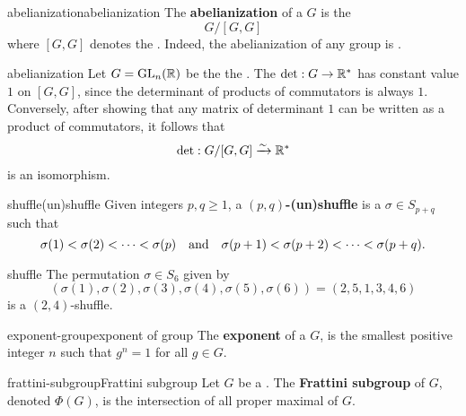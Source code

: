 \begin{topic}{abelianization}{abelianization}
    The \textbf{abelianization} of a  $G$ is the 
    \[ G/[G, G] \]
    where $[G, G]$ denotes the . Indeed, the abelianization of any group is .
\end{topic}

\begin{example}{abelianization}
    Let $G = \textup{GL}_n(\mathbb{R})$ be the the . The  $\det : G \to \mathbb{R}^*$ has constant value $1$ on $[G, G]$, since the determinant of products of commutators is always $1$. Conversely, after showing that any matrix of determinant $1$ can be written as a product of commutators, it follows that
    \[ \det : G / [G, G] \xrightarrow{\sim} \mathbb{R}^* \]
    is an isomorphism.
\end{example}

\begin{topic}{shuffle}{(un)shuffle}
    Given integers $p, q \ge 1$, a \textbf{$(p, q)$-(un)shuffle} is a  $\sigma \in S_{p + q}$ such that
    \[ \sigma(1) < \sigma(2) < \cdots < \sigma(p) \quad \textup{and} \quad \sigma(p + 1) < \sigma(p + 2) < \cdots < \sigma(p + q) . \]
\end{topic}

\begin{example}{shuffle}
    The permutation $\sigma \in S_6$ given by
    \[ (\sigma(1), \sigma(2), \sigma(3), \sigma(4), \sigma(5), \sigma(6)) = (2, 5, 1, 3, 4, 6) \]
    is a $(2, 4)$-shuffle.
\end{example}

\begin{topic}{exponent-group}{exponent of group}
    The \textbf{exponent} of a  $G$, is the smallest positive integer $n$ such that $g^n = 1$ for all $g \in G$.
\end{topic}

\begin{topic}{frattini-subgroup}{Frattini subgroup}
    Let $G$ be a . The \textbf{Frattini subgroup} of $G$, denoted $\Phi(G)$, is the intersection of all proper maximal  of $G$.
\end{topic}

